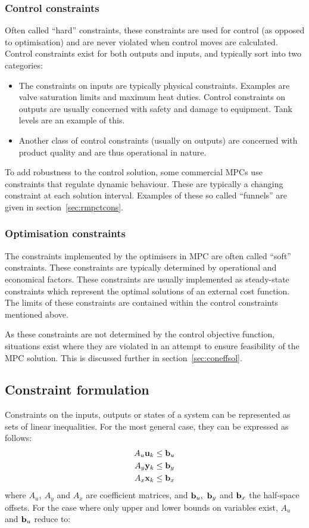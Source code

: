 \subsubsection{Control constraints}
Often called ``hard'' constraints, these constraints are used for control (as opposed to optimisation) and are never violated when control moves are calculated.
Control constraints exist for both outputs and inputs, and typically sort into two categories:
\begin{itemize}
  \item The constraints on inputs are typically physical constraints.
    Examples are valve saturation limits and maximum heat duties.
    Control constraints on outputs are usually concerned with safety and damage to equipment.
    Tank levels are an example of this.
  \item Another class of control constraints (usually on outputs) are concerned with product quality and are thus operational in nature.
\end{itemize}
To add robustness to the control solution, some commercial MPCs use constraints that regulate dynamic behaviour.
These are typically a changing constraint at each solution interval.
Examples of these so called ``funnels'' are given in section~\ref{sec:rmpctcons}.

\subsubsection{Optimisation constraints}
The constraints implemented by the optimisers in MPC are often called ``soft'' constraints.
These constraints are typically determined by operational and economical factors.
These constraints are usually implemented as steady-state constraints which represent the optimal solutions of an external cost function.
The limits of these constraints are contained within the control constraints mentioned above.

As these constraints are not determined by the control objective function, situations exist where they are violated in an attempt to ensure feasibility of the MPC solution.
This is discussed further in section~\ref{sec:coneffsol}.
 
\subsection{Constraint formulation}
Constraints on the inputs, outputs or states of a system can be represented as sets of linear inequalities.
For the most general case, they can be expressed as follows:
\begin{align}
  \label{eq:gencons}
  A_u{\bf {u}}_k &\leq {\bf {b}}_u \notag \\
  A_y{\bf {y}}_k &\leq {\bf {b}}_y \\
  A_x{\bf {x}}_k &\leq {\bf {b}}_x \notag
\end{align}
where $A_u,~A_y$ and $A_x$ are coefficient matrices, and ${\bf {b}}_u,~{\bf {b}}_y$ and ${\bf {b}}_x$ the half-space offsets.
For the case where only upper and lower bounds on variables exist, $A_u$ and ${\bf {b}}_u$ reduce to:%
%
%

